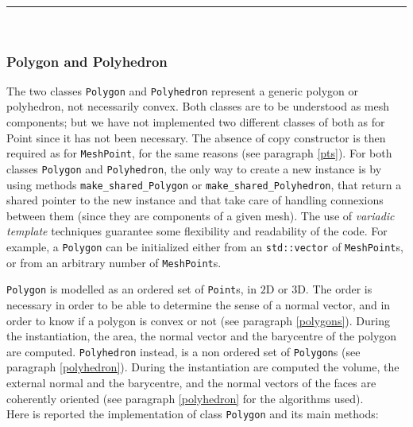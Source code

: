 \noindent\rule{12.7cm}{1pt}\\

\subsubsection{Polygon and Polyhedron}
The two classes \verb|Polygon| and \verb|Polyhedron| represent a generic polygon or polyhedron, not necessarily convex. Both classes are to be understood as mesh components; but we have not implemented two different classes of both as for Point since it has not been necessary. The absence of copy constructor is then required as for \verb|MeshPoint|, for the same reasons (see paragraph \ref{pts}). For both classes \verb|Polygon| and \verb|Polyhedron|, the only way to create a new instance is by using methods \verb|make_shared_Polygon| or \verb|make_shared_Polyhedron|, that return a shared pointer to the new instance and that take care of handling connexions between them (since they are components of a given mesh). 
The use of \textit{variadic template} techniques guarantee some flexibility and readability of the code. For example, a \verb|Polygon| can be initialized either from an \verb|std::vector| of \verb|MeshPoint|s, or from an arbitrary number of \verb|MeshPoint|s. 

\verb|Polygon| is modelled as an ordered set of \verb|Point|s, in $2$D or $3$D. The order is necessary in order to be able to determine the sense of a normal vector, and in order to know if a polygon is convex or not (see paragraph \ref{polygons}). During the instantiation, the area, the normal vector and the barycentre of the polygon are computed. \verb|Polyhedron| instead, is a non ordered set of \verb|Polygon|s (see paragraph \ref{polyhedron}). During the instantiation are computed the volume, the external normal and the barycentre, and the normal vectors of the faces are coherently oriented (see paragraph \ref{polyhedron} for the algorithms used). \\

Here is reported the implementation of class \verb|Polygon| and its main methods:\\

